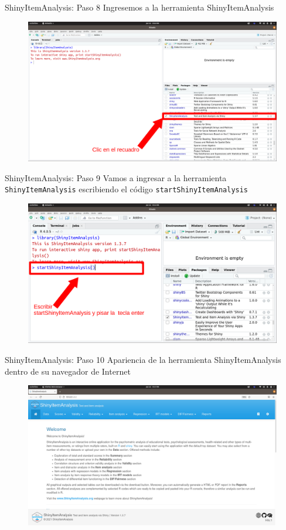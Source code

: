 \documentclass{beamer}
\begin{document}
\begin{frame}{ShinyItemAnalysis: Paso 8}
Ingresemos a la herramienta ShinyItemAnalysis
\begin{figure}
\centering
\includegraphics[width=.85\textwidth]{Paso7.png}
\end{figure}  
\end{frame}


\begin{frame}{ShinyItemAnalysis: Paso 9}
Vamos a ingresar a la herramienta  \texttt{ShinyItemAnalysis} escribiendo el código \texttt{startShinyItemAnalysis}
\begin{figure}
\centering
\includegraphics[width=.85\textwidth]{Paso8.png}
\end{figure}  
\end{frame}

\begin{frame}{ShinyItemAnalysis: Paso 10}
Apariencia de la herramienta ShinyItemAnalysis dentro de su navegador de Internet
\begin{figure}
\centering
\includegraphics[width=.85\textwidth]{Paso9.png}
\end{figure}  
\end{frame}
\end{document}
